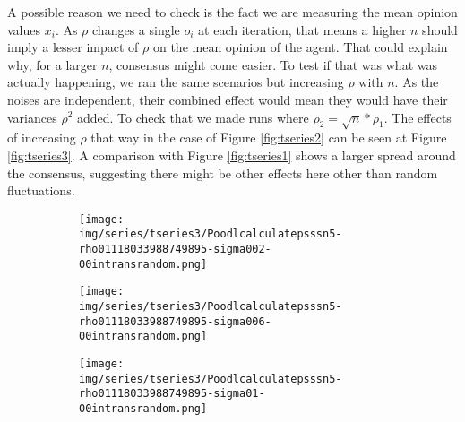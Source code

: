 \documentclass{article}
\begin{document}
{          A possible reason we need to check is the fact we are measuring the
          mean opinion values \( x_i \). As \(\rho\) changes a single \(o_i\) at
          each iteration, that means a higher \(n\) should imply a lesser impact
          of \(\rho\) on the mean opinion of the agent. That could explain why,
          for a larger $n$, consensus might come easier. To test if that was
          what was actually happening, we ran the same scenarios but increasing
          \(\rho\) with \(n\). As the noises are independent, their combined effect would mean
          they would have their variances $\rho^2$ added. To check that we made runs where
          \(\rho_2 = \sqrt{n} * \rho_1 \). The
          effects of increasing \(\rho\) that way in the case of Figure
          \ref{fig:tseries2} can be seen at Figure \ref{fig:tseries3}. A
          comparison with Figure \ref{fig:tseries1} shows a larger spread around
          the consensus, suggesting there might be other effects here other than
          random fluctuations.


    \begin{figure}[H]
      \centering
      \begin{subfigure}[b]{0.48\textwidth}
      \texttt{[image: img/series/tseries3/Poodlcalculatepsssn5-rho01118033988749895-sigma002-00intransrandom.png]}
    \end{subfigure}
    \begin{subfigure}[b]{0.48\textwidth}
      \texttt{[image: img/series/tseries3/Poodlcalculatepsssn5-rho01118033988749895-sigma006-00intransrandom.png]}
    \end{subfigure}
      \begin{subfigure}[b]{0.48\textwidth}
      \texttt{[image: img/series/tseries3/Poodlcalculatepsssn5-rho01118033988749895-sigma01-00intransrandom.png]}
    \end{subfigure}


\end{figure}}
\end{document}

